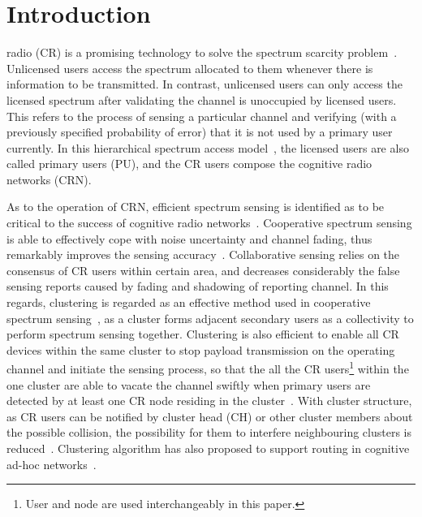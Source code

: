 \documentclass[journal,comsoc]{IEEEtran}
\theoremstyle{mytheoremstyle}
\theoremstyle{mytheoremstyle}
\theoremstyle{mytheoremstyle}
\begin{document}
\graphicspath{
{/home/di/work/thesis/thesisTemplate/figures/04_clutering/}
}


\section{Introduction}
\label{intro}
 radio (CR) is a promising technology to solve the spectrum scarcity problem~\cite{Mitola}.
Unlicensed users access the spectrum allocated to them whenever there is information to be transmitted.
In contrast, unlicensed users can only access the licensed spectrum after validating the channel is unoccupied by licensed users.
This refers to the process of sensing a particular channel and verifying (with a previously specified probability of error) that it is not used by a primary user currently.
In this hierarchical spectrum access model~\cite{zhao_survey_DSA_2007}, the licensed users are also called primary users (PU), and the CR users compose the cognitive radio networks (CRN).

As to the operation of CRN, efficient spectrum sensing is identified as to be critical to the success of cognitive radio networks~\cite{Sahai_FundamentalDesignTradeoffs2006}.
Cooperative spectrum sensing is able to effectively cope with noise uncertainty and channel fading, thus remarkably improves the sensing accuracy~\cite{coorperativeSensing_Akyildiz11}.
Collaborative sensing relies on the consensus of CR users within certain area, and decreases considerably the false sensing reports caused by fading and shadowing of reporting channel.
In this regards, clustering is regarded as an effective method used in cooperative spectrum sensing~\cite{Sun07_clustering_spectrum_secsing, Zhao07}, as a cluster forms adjacent secondary users as a collectivity to perform spectrum sensing together.
Clustering is also efficient to enable all CR devices within the same cluster to stop payload transmission on the operating channel and initiate the sensing process, so that the all the CR users\footnote{User and node are used interchangeably in this paper.} within the one cluster are able to vacate the channel swiftly when primary users are detected by at least one CR node residing in the cluster~\cite{willkomm08}.
With cluster structure, as CR users can be notified by cluster head (CH) or other cluster members about the possible collision, the possibility for them to interfere neighbouring clusters is reduced~\cite{centralizedSharing80222}. 
Clustering algorithm has also proposed to support routing in cognitive ad-hoc networks~\cite{Abbasi_survey_07}.
\end{document}
